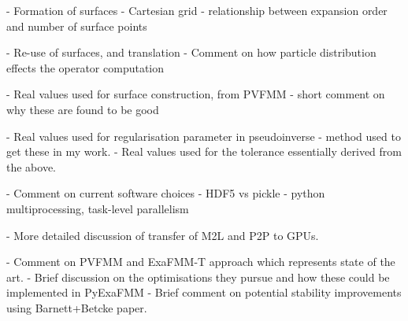 - Formation of surfaces
    - Cartesian grid
    - relationship between expansion order and number of surface points

- Re-use of surfaces, and translation
    - Comment on how particle distribution effects the operator computation

- Real values used for surface construction, from PVFMM
    - short comment on why these are found to be good

- Real values used for regularisation parameter in pseudoinverse
    - method used to get these in my work.
    - Real values used for the tolerance essentially derived from the above.

- Comment on current software choices
    - HDF5 vs pickle
    - python multiprocessing, task-level parallelism

- More detailed discussion of transfer of M2L and P2P to GPUs.

- Comment on PVFMM and ExaFMM-T approach which represents state of the art.
    - Brief discussion on the optimisations they pursue and how these could
    be implemented in PyExaFMM
    - Brief comment on potential stability improvements using Barnett+Betcke
    paper.
